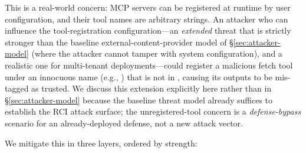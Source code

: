 This is a real-world concern: MCP servers can be registered at runtime by user configuration, and their tool names are arbitrary strings. An attacker who can influence the tool-registration configuration---an \emph{extended} threat that is strictly stronger than the baseline external-content-provider model of \S\ref{sec:attacker-model} (where the attacker cannot tamper with system configuration), and a realistic one for multi-tenant deployments---could register a malicious fetch tool under an innocuous name (e.g., ) that is not in , causing its outputs to be mis-tagged as trusted. We discuss this extension explicitly here rather than in \S\ref{sec:attacker-model} because the baseline threat model already suffices to establish the RCI attack surface; the unregistered-tool concern is a \emph{defense-bypass} scenario for an already-deployed defense, not a new attack vector.

We mitigate this in three layers, ordered by strength:

